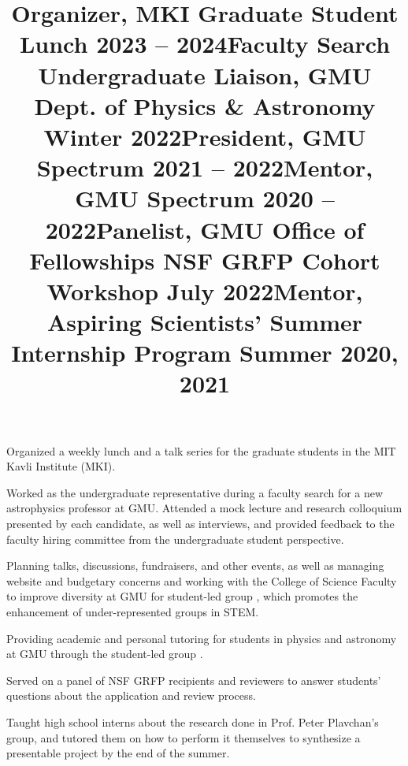 \documentclass[marg, centered]{res}
\begin{document}
\begin{resume}
\title{\textbf{Organizer}, MKI Graduate Student Lunch \hfill \textbf{2023 -- 2024}}
\begin{position}
{\small Organized a weekly lunch and a talk series for the graduate students in the MIT Kavli Institute (MKI).}
\end{position}

\title{\textbf{Faculty Search Undergraduate Liaison}, GMU Dept. of Physics \& Astronomy \hfill \textbf{Winter 2022}}
\begin{position}
{\small Worked as the undergraduate representative during a faculty search for a new astrophysics professor at GMU. Attended a mock lecture and research colloquium presented by each candidate, as well as interviews, and provided feedback to the faculty hiring committee from the undergraduate student perspective.}
\end{position}

\title{\textbf{President}, GMU Spectrum \hfill \textbf{2021 -- 2022}}
\begin{position}
{\small Planning talks, discussions, fundraisers, and other events, as well as managing website and budgetary concerns and working with the College of Science Faculty to improve diversity at GMU for student-led group \href{https://gmuspectrum.squarespace.com/}{\color{dkbu}{Spectrum}}, which promotes the enhancement of under-represented groups in STEM.}
\end{position}

\title{\textbf{Mentor}, GMU Spectrum \hfill \textbf{2020 -- 2022}}
\begin{position}
{\small Providing academic and personal tutoring for students in physics and astronomy at GMU through the student-led group \href{https://gmuspectrum.squarespace.com/}{\color{dkbu}{Spectrum}}.}
\end{position}

\title{\textbf{Panelist}, GMU Office of Fellowships NSF GRFP Cohort Workshop \hfill \textbf{July 2022}}
\begin{position}
{\small Served on a panel of NSF GRFP recipients and reviewers to answer students' questions about the application and review process.}
\end{position}

\title{\textbf{Mentor}, Aspiring Scientists' Summer Internship Program \hfill \textbf{Summer 2020, 2021}}
\begin{position}
{\small Taught high school interns about the research done in Prof. Peter Plavchan's group, and tutored them on how to perform it themselves to synthesize a presentable project by the end of the summer.}
\end{position}



\end{resume}
\end{document}
